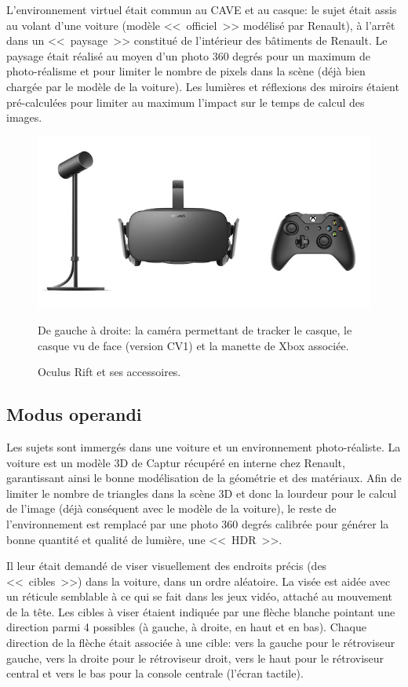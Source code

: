 	\par L'environnement virtuel était commun au CAVE et au casque: le sujet était assis au volant d'une voiture (modèle <<~officiel~>> modélisé par Renault), à l'arrêt dans un <<~paysage~>> constitué de l'intérieur des bâtiments de Renault. Le paysage était réalisé au moyen d'un photo 360 degrés pour un maximum de photo-réalisme et pour limiter le nombre de pixels dans la scène (déjà bien chargée par le modèle de la voiture). Les lumières et réflexions des miroirs étaient pré-calculées pour limiter au maximum l'impact sur le temps de calcul des images.
	
	\begin{figure}
		\centering
		\includegraphics[scale=.65]{Figures/OculusRift}
		\caption{Oculus Rift et ses accessoires.}{De gauche à droite: la caméra permettant de tracker le casque, le casque vu de face (version CV1) et la manette de Xbox associée.}
		\label{fig:oculus_rift}
	\end{figure}
	
	\subsection{Modus operandi}
	\par Les sujets sont immergés dans une voiture et un environnement photo-réaliste. La voiture est un modèle 3D de Captur récupéré en interne chez Renault, garantissant ainsi le bonne modélisation de la géométrie et des matériaux. Afin de limiter le nombre de triangles dans la scène 3D et donc la lourdeur pour le calcul de l'image (déjà conséquent avec le modèle de la voiture), le reste de l'environnement est remplacé par une photo 360 degrés calibrée pour générer la bonne quantité et qualité de lumière, une <<~HDR~>>.
	
	\par Il leur était demandé de viser visuellement des endroits précis (des <<~cibles~>>) dans la voiture, dans un ordre aléatoire. La visée est aidée avec un réticule semblable à ce qui se fait dans les jeux vidéo, attaché au mouvement de la tête. Les cibles à viser étaient indiquée par une flèche blanche pointant une direction parmi 4 possibles (à gauche, à droite, en haut et en bas). Chaque direction de la flèche était associée à une cible: vers la gauche pour le rétroviseur gauche, vers la droite pour le rétroviseur droit, vers le haut pour le rétroviseur central et vers le bas pour la console centrale (l'écran tactile).
	
